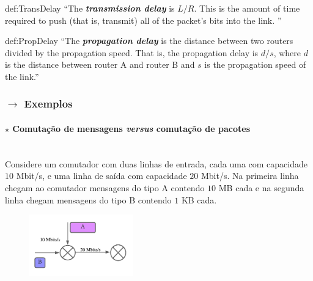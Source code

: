 \begin{theo}{def:TransDelay}\label{def:TransDelay}
    ``The \textbf{\textit{transmission delay}} is $L/R$. This is the amount of time required to push (that is, transmit) all of the packet’s bits into the link. ''\cite{Kurose2017}
\end{theo}

\begin{theo}{def:PropDelay}\label{def:PropDelay}
    ``The \textbf{\textit{propagation delay}} is the distance between two routers divided by the propagation speed. That is, the propagation delay is $d/s$, where $d$ is the distance between router A and router B and $s$ is the propagation speed of the link.''\cite{Kurose2017}
\end{theo}

\renewcommand*{\thefootnote}{\fnsymbol{footnote}}
\renewcommand*{\thefootnote}{\arabic{footnote}}
\clearpage
\subsubsection[1.3.2 Exemplos]{$\pmb{\rightarrow}$ Exemplos}
\paragraph[1.3.2.1 Comutação de mensagens vs. comutação de pacotes]{$\pmb{\star}$ Comutação de mensagens \textit{versus} comutação de pacotes}\mbox{}\\[4pt]
{\small
    Considere um comutador com duas linhas de entrada, cada uma com capacidade $10$ Mbit/s, e uma linha de saída com capacidade $20$ Mbit/s. Na primeira linha chegam ao comutador mensagens do tipo A contendo $10$ MB cada e na segunda linha chegam mensagens do tipo B contendo $1$ KB cada.
}

\vspace{1 em}
\begin{figure}[H]
    \centering
    \vspace{-8mm}
    \includegraphics[width=0.4\textwidth]{img/1/diagram.png}
    \hfill{}
    \label{fig:Dia}
\end{figure}

